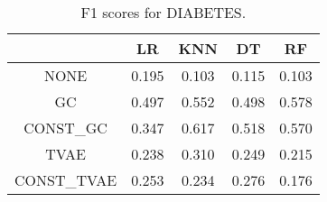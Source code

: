 \begin{table}
\caption{F1 scores for DIABETES.}
\label{tab:f1-DIABETES}
\begin{tabular}{ccccc}
\toprule
 & LR & KNN & DT & RF \\
\midrule
NONE & 0.195 & 0.103 & 0.115 & 0.103 \\
GC & 0.497 & 0.552 & 0.498 & 0.578 \\
CONST\_GC & 0.347 & 0.617 & 0.518 & 0.570 \\
TVAE & 0.238 & 0.310 & 0.249 & 0.215 \\
CONST\_TVAE & 0.253 & 0.234 & 0.276 & 0.176 \\
\bottomrule
\end{tabular}
\end{table}
